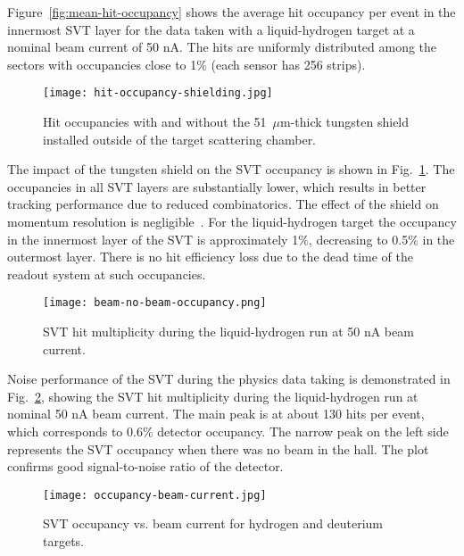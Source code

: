 Figure~\ref{fig:mean-hit-occupancy} shows the average hit occupancy per event in the innermost SVT layer for the data taken with a liquid-hydrogen target at a nominal beam current of 50 nA. The hits are uniformly distributed among the sectors with occupancies close to 1$\%$ (each sensor has 256 strips).

\begin{figure}[hbt] 
\centering 
\texttt{[image: hit-occupancy-shielding.jpg]}
\caption{Hit occupancies with and without the 51~$\mu$m-thick tungsten shield installed outside of the target scattering chamber.}
\label{fig:hit-occupancy-shielding}
\end{figure}

The impact of the tungsten shield on the SVT occupancy is shown in Fig.~\ref{fig:hit-occupancy-shielding}. The occupancies in all SVT layers are substantially lower, which results in better tracking performance due to reduced combinatorics. The effect of the shield on momentum resolution is negligible~\cite{SHIELDNOTE}. For the liquid-hydrogen target the occupancy in the innermost layer of the SVT is approximately 1$\%$, decreasing to 0.5$\%$ in the outermost layer. There is no hit efficiency loss due to the dead time of the readout system at such occupancies.

\begin{figure}[hbt] 
\centering 
\texttt{[image: beam-no-beam-occupancy.png]}
\caption{SVT hit multiplicity during the liquid-hydrogen run at 50 nA beam current.}
\label{fig:beam-no-beam-occupancy}
\end{figure}

Noise performance of the SVT during the physics data taking is demonstrated in Fig.~\ref{fig:beam-no-beam-occupancy}, showing the SVT hit multiplicity during the liquid-hydrogen run at nominal 50 nA beam current. The main peak is at about 130 hits per event, which corresponds to 0.6$\%$ detector occupancy. The narrow peak on the left side represents the SVT occupancy when there was no beam in the hall. The plot confirms good signal-to-noise ratio of the detector. 

\begin{figure}[hbt] 
\centering 
\texttt{[image: occupancy-beam-current.jpg]}
\caption{SVT occupancy vs. beam current for hydrogen and deuterium targets.}
\label{fig:occupancy-beam-current}
\end{figure}

